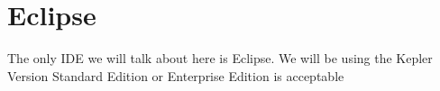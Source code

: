 \section{Eclipse}
The only IDE we will talk about here is Eclipse.  We will be using the Kepler Version Standard Edition or Enterprise Edition is acceptable


